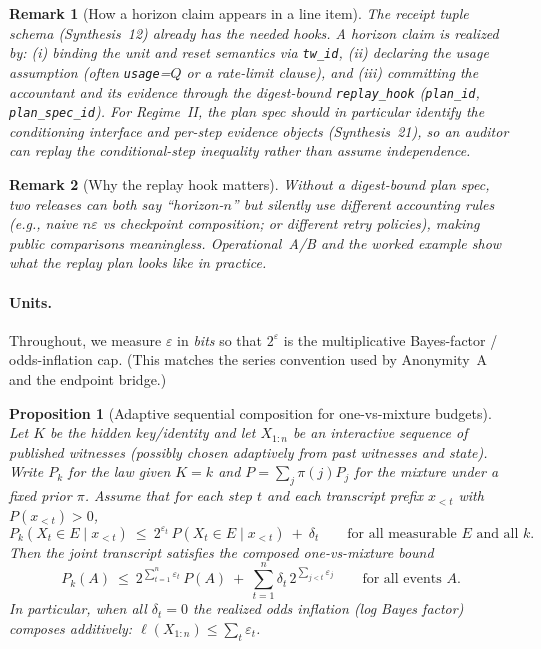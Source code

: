 \documentclass[11pt]{article}
\newtheorem{proposition}{Proposition}
\newtheorem{remark}{Remark}
\newcommand{\eps}{\varepsilon}
\begin{document}
\begin{remark}[How a horizon claim appears in a line item]
The receipt tuple schema (Synthesis~12) already has the needed hooks.\cite{series:receiptitems}
A horizon claim is realized by:
(i) binding the unit and reset semantics via \texttt{tw\_id},
(ii) declaring the usage assumption (often \texttt{usage}=$Q$ or a rate-limit clause), and
(iii) committing the \emph{accountant} and its evidence through the digest-bound \texttt{replay\_hook} (\texttt{plan\_id}, \texttt{plan\_spec\_id}).\cite{series:planstateequiv}
For Regime~II, the plan spec should in particular identify the conditioning interface and per-step evidence objects (Synthesis~21), so an auditor can replay the conditional-step inequality rather than assume independence.\cite{series:condcert}
\end{remark}

\begin{remark}[Why the replay hook matters]
Without a digest-bound plan spec, two releases can both say ``horizon-$n$'' but silently use different accounting rules (e.g., naive $n\eps$ vs checkpoint composition; or different retry policies), making public comparisons meaningless.
Operational~A/B and the worked example show what the replay plan looks like in practice.\cite{series:operationalA,series:operationalB,series:workedexample}
\end{remark}

\paragraph{Units.}
Throughout, we measure $\eps$ in \emph{bits} so that $2^{\eps}$ is the multiplicative Bayes-factor / odds-inflation cap.
(This matches the series convention used by Anonymity~A and the endpoint bridge.)\cite{series:oddsinflation}

\begin{proposition}[Adaptive sequential composition for one-vs-mixture budgets]\label{prop:adaptivecomp}
Let $K$ be the hidden key/identity and let $X_{1:n}$ be an interactive sequence of published witnesses (possibly chosen adaptively from past witnesses and state).
Write $P_k$ for the law given $K=k$ and $P=\sum_{j}\pi(j)P_j$ for the mixture under a fixed prior $\pi$.
Assume that for each step $t$ and each transcript prefix $x_{<t}$ with $P(x_{<t})>0$,
\[
P_k(X_t\in E\mid x_{<t})\ \le\ 2^{\eps_t}\,P(X_t\in E\mid x_{<t})\ +\ \delta_t
\qquad\text{for all measurable }E\text{ and all }k.
\]
Then the joint transcript satisfies the composed one-vs-mixture bound
\[
P_k(A)\ \le\ 2^{\sum_{t=1}^n\eps_t}\,P(A)\ +\ \sum_{t=1}^n \delta_t\,2^{\sum_{j<t}\eps_j}
\qquad\text{for all events }A.
\]
In particular, when all $\delta_t=0$ the realized odds inflation (log Bayes factor) composes additively: $\ell(X_{1:n})\le\sum_t\eps_t$.
\end{proposition}
\end{document}

